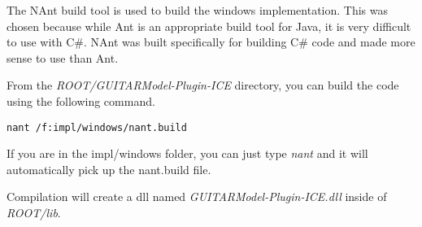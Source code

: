 \documentclass[12pt,letterpage]{article}
\begin{document}
The NAnt build tool is used to build the windows implementation. This was chosen because while Ant is an appropriate build tool for Java, it is very difficult to use with C\#. NAnt was built specifically for building C\# code and made more sense to use than Ant.

From the \emph{ROOT/GUITARModel-Plugin-ICE} directory, you can build the code using the following command.

\begin{verbatim}
nant /f:impl/windows/nant.build
\end{verbatim}

If you are in the impl/windows folder, you can just type \emph{nant} and it will automatically pick up the nant.build file.

Compilation will create a dll named \emph{GUITARModel-Plugin-ICE.dll} inside of \emph{ROOT/lib}.
\end{document}
